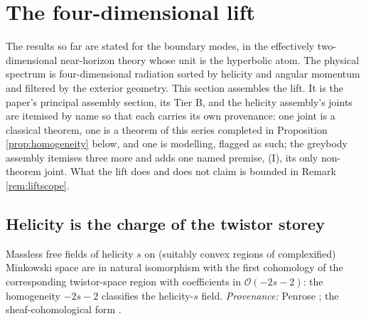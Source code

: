 \section{The four-dimensional lift}\label{sec:lift}

The results so far are stated for the boundary modes, in the effectively two-dimensional near-horizon theory whose unit is the hyperbolic atom. The physical spectrum is four-dimensional radiation sorted by helicity and angular momentum and filtered by the exterior geometry. This section assembles the lift. It is the paper's principal assembly section, its Tier B, and the helicity assembly's joints are itemised by name so that each carries its own provenance: one joint is a classical theorem, one is a theorem of this series completed in Proposition \ref{prop:homogeneity} below, and one is modelling, flagged as such; the greybody assembly itemises three more and adds one named premise, (I), its only non-theorem joint. What the lift does and does not claim is bounded in Remark \ref{rem:liftscope}.

\subsection{Helicity is the charge of the twistor storey}\label{subsec:helicity}

\begin{fact}\label{fact:penrose}
Massless free fields of helicity $s$ on (suitably convex regions of complexified) Minkowski space are in natural isomorphism with the first cohomology of the corresponding twistor-space region with coefficients in $\mathcal{O}(-2s-2)$: the homogeneity $-2s-2$ classifies the helicity-$s$ field. \emph{Provenance:} Penrose \cite{Penrose1969}; the sheaf-cohomological form \cite{EPW1981}.
\end{fact}

